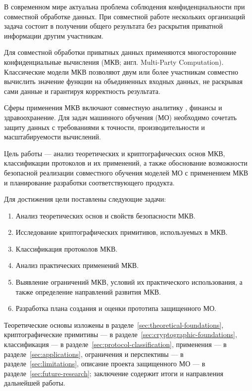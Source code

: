 \introduction %

В современном мире актуальна проблема соблюдения конфиденциальности при совместной обработке данных. При совместной работе нескольких организаций задача состоит в получении общего результата без раскрытия приватной информации другим участникам.

Для совместной обработки приватных данных применяются многосторонние конфиденциальные вычисления (МКВ; англ. Multi-\allowbreak Party Computation). Классические модели МКВ позволяют двум или более участникам совместно вычислить значение функции на объединенных входных данных, не раскрывая сами данные и гарантируя корректность результата.

Сферы применения МКВ включают совместную аналитику \cite{17}, финансы и здравоохранение. Для задач машинного обучения (МО) необходимо сочетать защиту данных с требованиями к точности, производительности и масштабируемости вычислений.

Цель работы --- анализ теоретических и криптографических основ МКВ, классификации протоколов и их применений, а также обоснование возможности безопасной реализации совместного обучения моделей МО с применением МКВ и планирование разработки соответствующего продукта.

Для достижения цели поставлены следующие задачи:

\begin{enumerate}

\item Анализ теоретических основ и свойств безопасности МКВ.

\item Исследование криптографических примитивов, используемых в МКВ.

\item Классификация протоколов МКВ.

\item Анализ практических применений МКВ.

\item Выявление ограничений МКВ, условий их практического использования, а также определение направлений развития МКВ.

\item Разработка плана создания и оценки прототипа защищенного МО.

\end{enumerate}

Теоретические основы изложены в разделе~\ref{sec:theoretical-foundations}, криптографические примитивы --- в разделе~\ref{sec:cryptographic-foundations}, классификация --- в разделе~\ref{sec:protocol-classification}, применения --- в разделе~\ref{sec:applications}, ограничения и перспективы --- в разделе~\ref{sec:limitations}, описание проекта защищенного МО --- в разделе~\ref{sec:future-research}; заключение содержит итоги и направления дальнейшей работы.